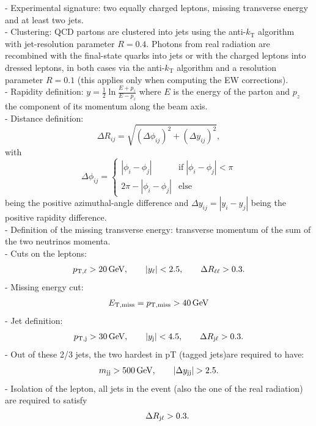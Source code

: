 \documentclass[a4paper,10pt]{report}
\begin{document}
%
- Experimental signature:
two equally charged leptons, missing transverse energy and at least two jets. \\
- Clustering: QCD partons are clustered into jets using the anti-$k_\text{T}$ algorithm  with jet-resolution parameter $R=0.4$.
Photons from real radiation are recombined with the final-state quarks into jets or with the charged leptons into dressed leptons, in both cases via the anti-$k_\text{T}$ algorithm and a resolution parameter $R=0.1$ 
(this applies only when computing the EW corrections). \\
%
- Rapidity definition: $y=\frac{1}{2}\ln \frac{E+p_z}{E-p_z}$ where $E$ is the energy of the parton and $p_z$ the component of its momentum along the beam axis. \\
%
- Distance definition:
\begin{equation}
        \Delta R_{ij} = \sqrt{(\Delta \phi_{ij})^2+(\Delta y_{ij})^2},
\end{equation}
with
\begin{equation}
\Delta \phi_{ij} = \begin{cases}
|\phi_i-\phi_j|         & \text{if} \; |\phi_i-\phi_j| < \pi \\
2 \pi - |\phi_i-\phi_j| & \text{else}
\end{cases}
\end{equation}
being the positive azimuthal-angle difference and $\Delta y_{ij} = |y_i - y_j|$ being the positive rapidity difference. \\
%
- Definition of the missing transverse energy: transverse momentum of the sum of the two neutrinos momenta. \\
%
- Cuts on the leptons:
\begin{align}
 p_{\text{T},\ell} >  20\,\text{GeV},\qquad |y_{\ell}| < 2.5, \qquad \Delta R_{\ell\ell}> 0.3.
\end{align}
%
- Missing energy cut:
\begin{align}
  E_{\text{T},\text{miss}}=p_{\rm T, miss} >  40\,\text{GeV}
\end{align}
%
- Jet definition:
%
\begin{align}
 p_{\text{T},\text{j}} >  30\,\text{GeV}, \qquad |y_\text{j}| < 4.5, \qquad\Delta R_{\text{j}\ell} > 0.3.
\end{align}
%
- Out of these 2/3 jets, the two hardest in pT (tagged jets)are required to have:
\begin{align}
 m_{\text{j} \text{j}} >  500\,\text{GeV},\qquad |\Delta y_{\text{j} \text{j}}| > 2.5.
\end{align}
%
- Isolation of the lepton, all jets in the event (also the one of the real radiation) are required to satisfy 
\begin{align}
 \qquad\Delta R_{\text{j}\ell} > 0.3 .
\end{align}
\end{document}
